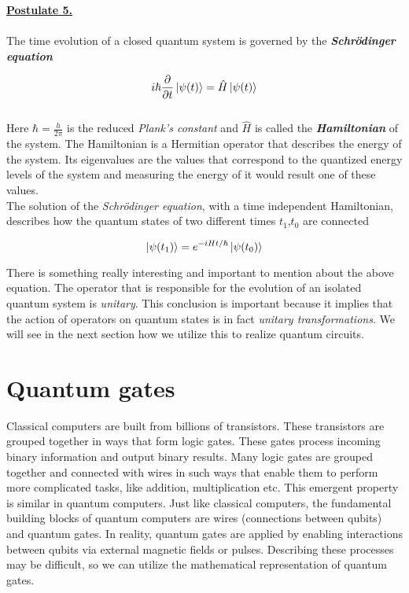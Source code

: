 \documentclass[12pt,a4paper]{report}
\begin{document}
\noindent
{\large \textbf{\underline{Postulate 5.}}}
\\~\\
The time evolution of a closed quantum system is governed by the \textbf{\textit{Schr\"{o}dinger equation}}

\begin{equation}
    i \hbar \frac{\partial}{\partial t} \ket{\psi(t)} = \hat H \ket{\psi(t)}
\end{equation}
\\

\noindent
Here $\hbar=\frac{h}{2\pi}$ is the reduced \emph{Plank's constant} and  $\hat H$ is called the \textbf{\textit{Hamiltonian}} of the system. The Hamiltonian is a Hermitian operator that describes the energy of the system. Its eigenvalues are the values that correspond to the quantized energy levels of the system and measuring the energy of it would result one of these values.
\\

\noindent
The solution of the \emph{Schr\"{o}dinger equation}, with a time independent Hamiltonian, describes how the quantum states of two different times $t_1$,$t_0$ are connected

\begin{equation}
    \ket{\psi(t_1)} = e^{-iHt/\hbar} \ket{\psi(t_0)}
\end{equation}

There is something really interesting and important to mention about the above equation. The operator that is responsible for the evolution of an isolated quantum system is \emph{unitary}. This conclusion is important because it implies that the action of operators on quantum states is in fact \emph{unitary transformations}. We will see in the next section how we utilize this to realize quantum circuits.

\section{Quantum gates}

Classical computers are built from billions of transistors. These transistors are grouped together in ways that form logic gates. These gates process incoming binary information and output binary results. Many logic gates are grouped together and connected with wires in such ways that enable them to perform more complicated tasks, like addition, multiplication etc. This emergent property is similar in quantum computers. Just like classical computers, the fundamental building blocks of quantum computers are wires (connections between qubits) and quantum gates. In reality, quantum gates are applied by enabling interactions between qubits via external magnetic fields or pulses. Describing these processes may be difficult, so we can utilize the mathematical representation of quantum gates.
\\
\end{document}

